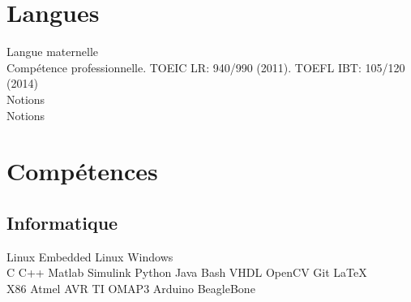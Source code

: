 \documentclass[a4paper]{deedy-resume} %
\begin{document}
\begin{minipage}[t]{0.25\textwidth} %



\section{Langues}

Langue maternelle\\
\vspace{4pt}
Compétence professionnelle. TOEIC LR: 940/990 (2011). TOEFL IBT: 105/120 (2014)\\
\vspace{4pt}
Notions\\
\vspace{4pt}
Notions

\sectionspace %


\section{Compétences}

\subsection{Informatique}
\vspace{2pt}
Linux \textbullet{} Embedded Linux \textbullet{} Windows\\
\vspace{3pt}
C \textbullet{} C++ \textbullet{} Matlab \textbullet{} Simulink \textbullet{} Python \textbullet{} Java \textbullet{} Bash \textbullet{} VHDL \textbullet{} OpenCV \textbullet{} Git \textbullet{} \LaTeX\\
\vspace{3pt}
X86 \textbullet{} Atmel AVR \textbullet{} TI OMAP3 \textbullet{} Arduino \textbullet{} BeagleBone

\sectionspace %



\end{minipage}
\end{document}

